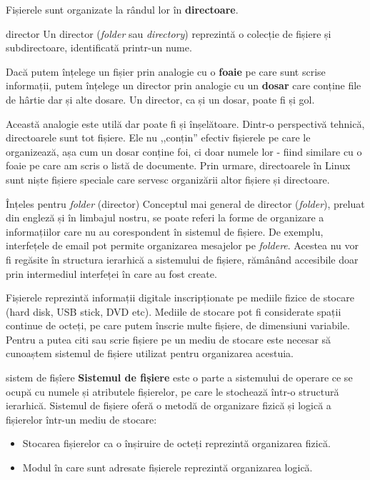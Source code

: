 Fișierele sunt organizate la rândul lor în \textbf{directoare}.

\begin{definition}{director}
Un director (\textit{folder} sau \textit{directory}) reprezintă o colecție de fișiere și subdirectoare, identificată printr-un nume.
\end{definition}

Dacă putem înțelege un fișier prin analogie cu o \textbf{foaie} pe care sunt
scrise informații, putem înțelege un director prin analogie cu un \textbf{dosar}
care conține file de hârtie dar și alte dosare. Un director, ca și un dosar,
poate fi și gol.

Această analogie este utilă dar poate fi și înșelătoare. Dintr-o perspectivă tehnică, directoarele sunt tot fișiere. Ele nu ,,conțin'' efectiv
fișierele pe care le organizează, așa cum un dosar conține foi, ci doar numele
lor - fiind similare cu o foaie pe care am scris o listă de documente. Prin
urmare, directoarele în Linux sunt niște fișiere speciale care servesc
organizării altor fișiere și directoare.

\begin{note}{Înțeles pentru \textit{folder} (director)}
Conceptul mai general de director (\textit{folder}), preluat din engleză și în limbajul nostru, se
poate referi la forme de organizare a informațiilor care nu au corespondent în
sistemul de fișiere. De exemplu, interfețele de email pot permite organizarea
mesajelor pe \textit{foldere}. Acestea nu vor fi regăsite în structura ierarhică a
sistemului de fișiere, rămânând accesibile doar prin intermediul interfeței în
care au fost create.
\end{note}

Fișierele reprezintă informații digitale inscripționate pe mediile fizice de
stocare (hard disk, USB stick, DVD etc). Mediile de stocare pot fi considerate
spații continue de octeți, pe care putem înscrie multe fișiere, de dimensiuni
variabile. Pentru a putea citi sau scrie fișiere pe un mediu de stocare este
necesar să cunoaștem sistemul de fișiere utilizat pentru organizarea acestuia.

\begin{definition}{sistem de fișîere}
\textbf{Sistemul de fișiere} este o parte a sistemului de operare ce se ocupă cu
numele și atributele fișierelor, pe care le stochează într-o structură
ierarhică. Sistemul de fișiere oferă o metodă de organizare fizică și logică a
fișierelor într-un mediu de stocare:

\begin{itemize}
	\item Stocarea fișierelor ca o înșiruire de octeți reprezintă
		organizarea fizică.
	\item Modul în care sunt adresate fișierele reprezintă organizarea
		logică.
\end{itemize}
\end{definition}

